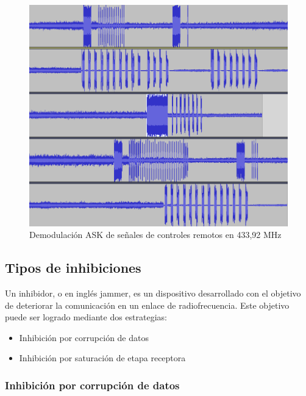 \documentclass[12pt]{report}
\begin{document}
\begin{figure}[htb]
	\centering
	\includegraphics[scale=0.4]{llaves.png}
	\caption{Demodulación ASK de señales de controles remotos en 433,92 MHz}
	\label{llaves}
\end{figure}

\subsection{Tipos de inhibiciones}

Un inhibidor, o en inglés jammer, es un dispositivo desarrollado con el objetivo de deteriorar la comunicación en un enlace de 
radiofrecuencia. Este objetivo puede ser logrado mediante dos estrategias:

\begin{itemize}
    \item Inhibición por corrupción de datos
    \item Inhibición por saturación de etapa receptora

\end{itemize}

\subsubsection{Inhibición por corrupción de datos}
\end{document}
